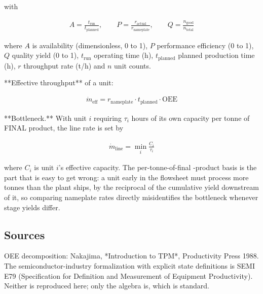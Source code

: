 \documentclass[10pt,a4paper,twoside]{report}
\begin{document}
with

\begin{equation*}
\begin{gathered}
A = \frac{t_{\mathrm{run}}}{t_{\mathrm{planned}}}, \qquad P = \frac{r_{\mathrm{actual}}}{r_{\mathrm{nameplate}}}, \qquad Q = \frac{n_{\mathrm{good}}}{n_{\mathrm{total}}}
\end{gathered}
\end{equation*}

where $A$ is availability (dimensionless, 0 to 1), $P$ performance efficiency (0 to 1), $Q$ quality yield (0 to 1), $t_{\mathrm{run}}$ operating time (h), $t_{\mathrm{planned}}$ planned production time (h), $r$ throughput rate (t/h) and $n$ unit counts.

**Effective throughput** of a unit:

\begin{equation*}
\begin{gathered}
\dot m_{\mathrm{eff}} = r_{\mathrm{nameplate}} \cdot t_{\mathrm{planned}} \cdot \mathrm{OEE}
\end{gathered}
\end{equation*}

**Bottleneck.** With unit $i$ requiring $\tau_i$ hours of its own capacity per tonne of FINAL product, the line rate is set by

\begin{equation*}
\begin{gathered}
\dot m_{\mathrm{line}} = \min_i \frac{C_i}{\tau_i}
\end{gathered}
\end{equation*}

where $C_i$ is unit $i$'s effective capacity. The per-tonne-of-final -product basis is the part that is easy to get wrong: a unit early in the flowsheet must process more tonnes than the plant ships, by the reciprocal of the cumulative yield downstream of it, so comparing nameplate rates directly misidentifies the bottleneck whenever stage yields differ.

\subsection*{Sources}

OEE decomposition: Nakajima, *Introduction to TPM*, Productivity Press 1988. The semiconductor-industry formalization with explicit state definitions is SEMI E79 (Specification for Definition and Measurement of Equipment Productivity). Neither is reproduced here; only the algebra is, which is standard.
\end{document}
